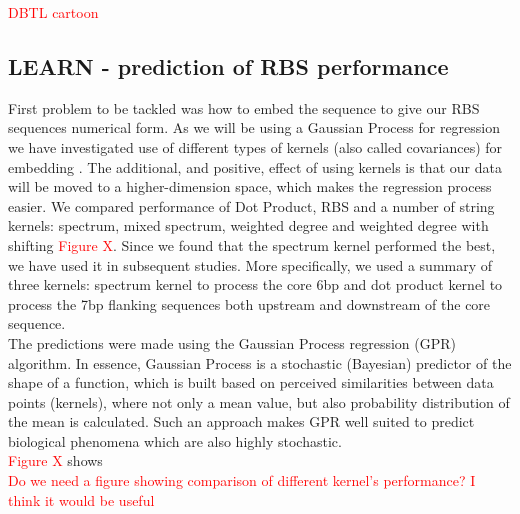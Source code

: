 \documentclass{article}
\begin{document}
\textcolor{red}{DBTL cartoon}

\subsection{LEARN - prediction of RBS performance}
First problem to be tackled was how to embed the sequence to give our RBS sequences numerical form. As we will be using a Gaussian Process for regression we have investigated use of different types of kernels (also called covariances) for embedding \cite{Ben-Hur2008}. The additional, and positive, effect of using kernels is that our data will be moved to a higher-dimension space, which makes the regression process easier. We compared performance of Dot Product, RBS and a number of string kernels: spectrum, mixed spectrum, weighted degree and weighted degree with shifting \textcolor{red}{Figure X}. Since we found that the spectrum kernel performed the best, we have used it in subsequent studies. More specifically, we used a summary of three kernels: spectrum kernel to process the core 6bp and dot product kernel to process the 7bp flanking sequences both upstream and downstream of the core sequence.\\
The predictions were made using the Gaussian Process regression (GPR) algorithm. In essence, Gaussian Process is a stochastic (Bayesian) predictor of the shape of a function, which is built based on  perceived similarities between data points (kernels), where not only a mean value, but also probability distribution of the mean is calculated. Such an approach makes GPR well suited to predict biological phenomena which are also highly stochastic. \\
\textcolor{red}{Figure X} shows \\

\textcolor{red}{Do we need a figure showing comparison of different kernel's performance? I think it would be useful}
\end{document}
